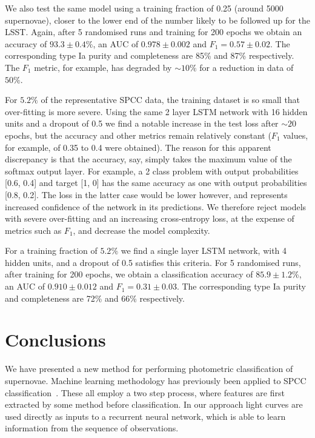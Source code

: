 \documentclass[nofootinbib,amsmath,amssymb,10pt,eqsecnum, twocolumn]{revtex4-1}
\begin{document}
We also test the same model using a training fraction of 0.25 (around 5000 supernovae), closer to the lower  end of the number likely to be followed up for the LSST. Again, after 5 randomised runs and training for 200 epochs we obtain an accuracy of $93.3 \pm 0.4\%$, an AUC of $0.978 \pm 0.002$ and $F_1 = 0.57 \pm 0.02$. The corresponding type Ia purity and completeness are 85\% and 87\% respectively. The $F_1$ metric, for example, has degraded by $\sim 10\%$ for a reduction in data of $50\%$.

For $5.2\%$ of the representative SPCC data, the training dataset is so small that over-fitting is more severe. Using the same 2 layer LSTM network with 16 hidden units and a dropout of 0.5 we find a notable increase in the test loss after $\sim 20$ epochs, but the accuracy and other metrics remain relatively constant ($F_1$ values, for example, of 0.35 to 0.4 were obtained). The reason for this apparent discrepancy is that the accuracy, say, simply takes the maximum value of the softmax output layer. For example, a 2 class problem with output probabilities [0.6, 0.4] and target [1, 0] has the same accuracy as one with output probabilities [0.8, 0.2]. The loss in the latter case would be lower however, and represents increased confidence of the network in its predictions. We therefore reject models with severe over-fitting and an increasing cross-entropy loss, at the expense of metrics such as $F_1$, and decrease the model complexity. 

For a training fraction of  $5.2\%$ we find a single layer LSTM network, with 4 hidden units, and a dropout of 0.5 satisfies this criteria. For 5 randomised runs, after training for  200 epochs, we obtain a classification accuracy of $85.9 \pm 1.2$\%, an AUC of $0.910 \pm 0.012$ and $F_1 = 0.31 \pm 0.03$. The corresponding type Ia purity and completeness are 72\% and 66\% respectively.

\section{Conclusions}

We have presented a new method for performing  photometric classification of supernovae. Machine learning methodology has previously been applied to SPCC classification~\cite{Newling:2010bp, Karpenka:2012pm, Lochner:2016hbn}. These all employ a two step process, where features are first extracted by some method before classification. In our approach light curves are used directly as inputs to a recurrent neural network, which is able to learn information from the sequence of observations.
\end{document}
